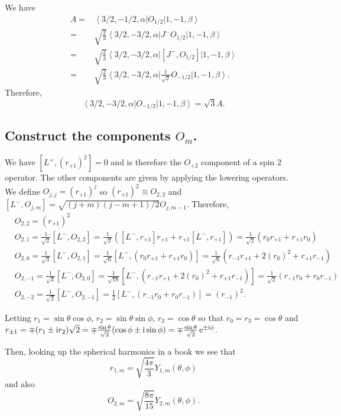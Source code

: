 \documentclass[main.tex]{subfiles}
\begin{document}
We have
\begin{align}
A=&\left<3/2,-1/2,\alpha\right|O_{1/2}\left|1,-1,\beta\right>\\
=&\sqrt{\frac{2}{3}}\left<3/2,-3/2,\alpha\right|J^-O_{1/2}\left|1,-1,\beta\right>\\
=&\sqrt{\frac{2}{3}}\left<3/2,-3/2,\alpha\right|[J^-,O_{1/2}]\left|1,-1,\beta\right>\\
=&\sqrt{\frac{2}{3}}\left<3/2,-3/2,\alpha\right|\frac{1}{\sqrt{2}}O_{-1/2}\left|1,-1,\beta\right>.
\end{align}
Therefore,
\begin{equation}
\left<3/2,-3/2,\alpha\right|O_{-1/2}\left|1,-1,\beta\right>=\sqrt{3}A.
\end{equation}
\subsection{Construct the components $O_m$.}
We have $[L^+,(r_{+1})^2]=0$ and is therefore the $O_{+2}$ component of a spin 2 operator. The other components are given by applying the lowering operators. We define $O_{j,j}=(r_{+1})^j$ so $(r_{+1})^2\equiv O_{2,2}$ and $[L^-,O_{j,m}]=\sqrt{(j+m)(j-m+1)/2}O_{j,m-1}$. Therefore,
\begin{align}
&O_{2,2}=(r_{+1})^2\\
&O_{2,1}=\frac{1}{\sqrt{2}}[L^-,O_{2,2}]=\frac{1}{\sqrt{2}}([L^-,r_{+1}]r_{+1}+r_{+1}[L^-,r_{+1}])=\frac{1}{\sqrt{2}}(r_{0}r_{+1}+r_{+1}r_{0})\\
&O_{2,0}=\frac{1}{\sqrt{3}}[L^-,O_{2,1}]=\frac{1}{\sqrt{6}}[L^-,(r_{0}r_{+1}+r_{+1}r_{0})]=\frac{1}{\sqrt{6}}(r_{-1}r_{+1}+2(r_0)^2+r_{+1}r_{-1})\\
&O_{2,-1}=\frac{1}{\sqrt{3}}[L^-,O_{2,0}]=\frac{1}{\sqrt{18}}[L^-,(r_{-1}r_{+1}+2(r_0)^2+r_{+1}r_{-1})]=\frac{1}{\sqrt{2}}(r_{-1}r_{0}+r_{0}r_{-1})\\
&O_{2,-2}=\frac{1}{\sqrt{2}}[L^-,O_{2,-1}]=\frac{1}{2}[L^-,(r_{-1}r_{0}+r_{0}r_{-1})]=(r_{-1})^2.
\end{align}

Letting $r_1=\sin{\theta}\cos{\phi}$, $r_2=\sin{\theta}\sin{\phi}$, $r_3=\cos{\theta}$ so that $r_0=r_3=\cos{\theta}$ and $r_{\pm1}=\mp(r_1\pm\mathrm{i} r_2)\sqrt{2}=\mp\frac{\sin{\theta}}{\sqrt{2}}(\cos{\phi}\pm\mathrm{i}\sin{\phi})=\mp\frac{\sin{\theta}}{\sqrt{2}}\operatorname{e}^{\pm\mathrm{i}\phi}$.

Then, looking up the spherical harmonics in a book \cite{foot} we see that
\begin{equation}
r_{1,m}=\sqrt{\frac{4\pi}{3}}Y_{1,m}(\theta,\phi)
\end{equation}
and also
\begin{equation}
O_{2,m}=\sqrt{\frac{8\pi}{15}}Y_{2,m}(\theta,\phi).
\end{equation}
\end{document}
